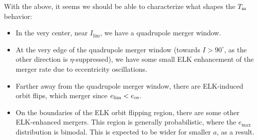 \documentclass[11pt,
        usenames, %
        dvipsnames %
    ]{article}
\begin{document}
With the above, it seems we should be able to characterize what shapes the
$T_{\rm m}$ behavior:
\begin{itemize}
    \item In the very center, near $I_{\lim}$, we have a quadrupole merger
        window.

    \item At the very edge of the quadrupole merger window (towards $I >
        90^\circ$, as the other direction is $\eta$-suppressed), we have some
        small ELK enhancement of the merger rate due to eccentricity
        oscillations.

    \item Farther away from the quadrupole merger window, there are ELK-induced
        orbit flips, which merger since $e_{\lim} < e_{\rm os}$.

    \item On the boundaries of the ELK orbit flipping region, there are some
        other ELK-enhanced mergers. This region is generally probabilistic,
        where the $e_{\max}$ distribution is bimodal. This is expected to be
        wider for smaller $a$, as a result.
\end{itemize}
\end{document}
